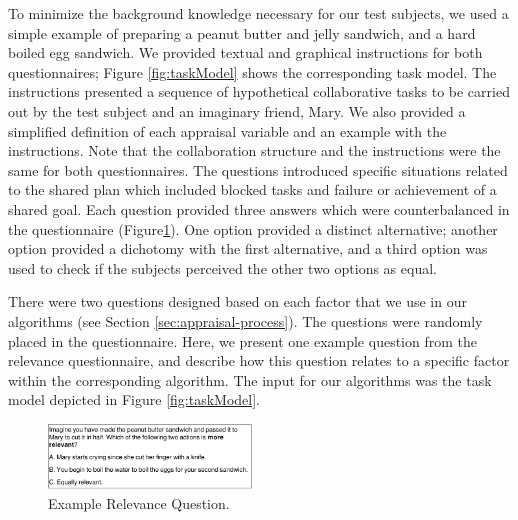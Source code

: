 \documentclass{article}
\begin{document}
To minimize the background knowledge necessary for our test subjects, we used a
simple example of preparing a peanut butter and jelly sandwich, and a hard
boiled egg sandwich. We provided textual and graphical instructions for
both questionnaires; Figure \ref{fig:taskModel} shows the corresponding task
model. The instructions presented a sequence of hypothetical collaborative tasks
to be carried out by the test subject and an imaginary friend, Mary. We also
provided a simplified definition of each appraisal variable and an example with
the instructions. Note that the collaboration structure and the instructions
were the same for both questionnaires. The questions introduced specific
situations related to the shared plan which included blocked tasks and failure
or achievement of a shared goal. Each question provided three answers which were
counterbalanced in the questionnaire (Figure\ref{fig:qs1}). One option provided
a distinct alternative; another option provided a dichotomy with the first
alternative, and a third option was used to check if the subjects perceived the
other two options as equal.

There were two questions designed based on each factor that we use in our
algorithms (see Section \ref{sec:appraisal-process}). The questions were
randomly placed in the questionnaire. Here, we present one example question from
the relevance questionnaire, and describe how this question relates to a
specific factor within the corresponding algorithm. The input for our algorithms
was the task model depicted in Figure \ref{fig:taskModel}.

\begin{figure}[tbh]
  \vspace{-1mm}
  \centering
  \includegraphics[width=0.48\textwidth]{figure/question-sample4-croped.pdf}
  \vspace*{-7mm}
  \caption{{\fontsize{9}{9}\selectfont Example Relevance Question.}}
  \label{fig:qs1}
  \vspace{-4mm}
\end{figure}
\end{document}
